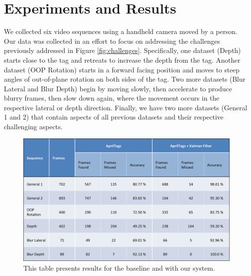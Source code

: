 \documentclass[letterpaper,10pt,conference]{IEEEtran}
\begin{document}
\section{Experiments and Results}
\label{sec:results}
We collected six video sequences using a handheld camera moved by a person. Our data was collected in an effort to focus on addressing the challenges previously addressed in Figure \ref{fig:challenges}. Specifically, one dataset (Depth) starts close to the tag and retreats to increase the depth from the tag. Another dataset (OOP Rotation) starts in a forward facing position and moves to steep angles of out-of-plane rotation on both sides of the tag. Two more datasets (Blur Lateral and Blur Depth) begin by moving slowly, then accelerate to produce blurry frames, then slow down again, where the movement occurs in the respective lateral or depth direction. Finally, we have two more datasets (General 1 and 2) that contain aspects of all previous datasets and their respective challenging aspects.

\begin{figure}
\centering
\includegraphics[scale=.4]{table1}
\caption{This table presents results for the baseline and with our system.}
\label{fig:table1}
\end{figure}
\end{document}
